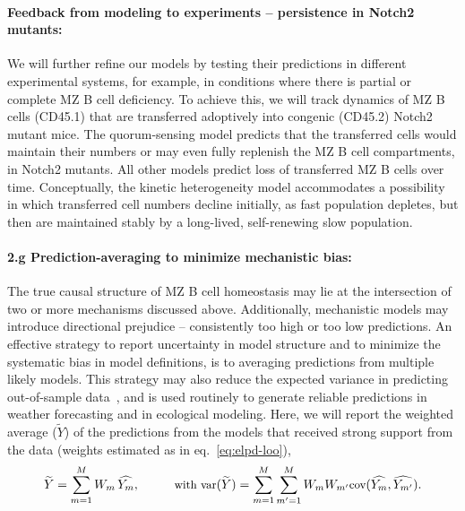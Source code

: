 \documentclass[11pt]{article}
\newcommand{\para}[1]{\vspace*{-4.5mm}\paragraph{#1}}
\begin{document}


\para{{Feedback from modeling to experiments -- persistence in Notch2 mutants:}}
We will further refine our models by testing their predictions in different experimental systems, for example, in conditions where there is partial or complete MZ B cell deficiency.
To achieve this, we will track dynamics of MZ B cells (CD45.1) that are transferred adoptively into congenic (CD45.2)  Notch2 mutant mice. %
The quorum-sensing model predicts that the transferred cells would maintain their numbers or may even fully replenish the MZ B cell compartments, in Notch2 mutants.
All other models predict loss of transferred MZ B cells over time.
Conceptually, the kinetic heterogeneity model accommodates a possibility in which transferred cell numbers decline initially, as fast population depletes, but then are maintained stably by a long-lived, self-renewing slow population.


\para{2.g Prediction-averaging to minimize  mechanistic bias:}
The true causal structure of MZ B cell homeostasis may lie at the intersection of two or more mechanisms discussed above.
Additionally, mechanistic models may introduce directional prejudice -- consistently too high or too low predictions. 
An effective strategy to report uncertainty in model structure and to minimize the systematic bias in model definitions, is to averaging predictions from multiple likely models. 
This strategy may also reduce the expected variance in predicting out-of-sample data~\cite{Wintle:2003, Dormann:2018}, and is used routinely to generate reliable predictions  in weather forecasting and in ecological modeling.
Here, we will report the weighted average ($\widetilde{Y}$) of the predictions from the models that received strong support from the data (weights estimated as in eq.~\ref{eq:elpd-loo}),
\vspace{-1mm}
\begin{equation} \small
\widetilde{Y} = \sum_{m=1}^{M} W_{m} \, \widehat{Y_{m}}, \quad \quad  \quad
\text{with } \text{var}(\widetilde{Y}) =  \sum_{m=1}^{M} \sum_{m'=1}^{M} W_{m} W_{m'} \text{cov}(\widehat{Y_{m}}, \widehat{Y_{m'}}).
\label{eq:model-averaging}
\vspace{-2mm}
\end{equation}
\end{document}
